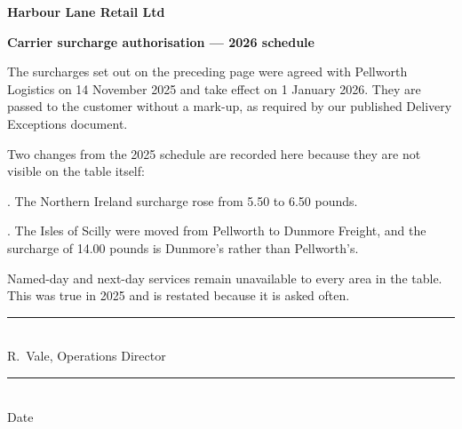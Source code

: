 \documentclass[11pt]{article}
\begin{document}
\noindent\textbf{\large Harbour Lane Retail Ltd}

\medskip
\noindent\textbf{Carrier surcharge authorisation --- 2026 schedule}

\bigskip
The surcharges set out on the preceding page were agreed with Pellworth
Logistics on 14 November 2025 and take effect on 1 January 2026. They are
passed to the customer without a mark-up, as required by our published
Delivery Exceptions document.

\medskip
Two changes from the 2025 schedule are recorded here because they are not
visible on the table itself:

\medskip
{}. The Northern Ireland surcharge rose from 5.50 to 6.50 pounds.

. The Isles of Scilly were moved from Pellworth to Dunmore Freight,
and the surcharge of 14.00 pounds is Dunmore's rather than Pellworth's.

\bigskip
Named-day and next-day services remain unavailable to every area in the table.
This was true in 2025 and is restated because it is asked often.

\vspace{18mm}
\noindent\rule{62mm}{0.4pt}\\
R.\ Vale, Operations Director

\vspace{8mm}
\noindent\rule{62mm}{0.4pt}\\
Date
\end{document}
